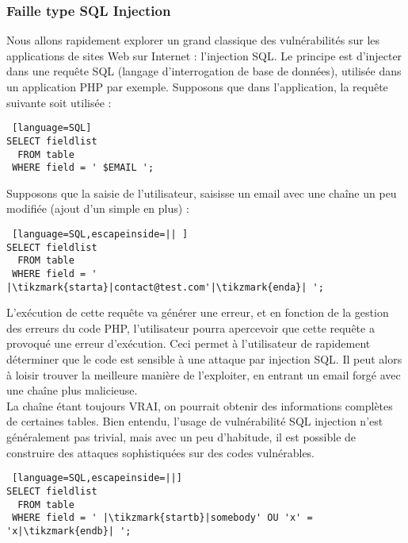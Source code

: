 \subsubsection{Faille type SQL Injection}

Nous allons rapidement explorer un grand classique des vulnérabilités sur les applications de sites Web sur Internet : l'injection SQL. Le principe est d'injecter dans une requête SQL (langage d'interrogation de base de données), utilisée dans un application PHP par exemple. Supposons que dans l'application, la requête suivante soit utilisée : \\
\begin{lstlisting} [language=SQL]
SELECT fieldlist
  FROM table 
 WHERE field = ' $EMAIL ';
\end{lstlisting}
Supposons que la saisie de l'utilisateur, saisisse un email avec une chaîne un peu modifiée (ajout d'un simple  en plus)  :
\\
\begin{lstlisting} [language=SQL,escapeinside=|| ]
SELECT fieldlist
  FROM table 
 WHERE field = '  |\tikzmark{starta}|contact@test.com'|\tikzmark{enda}| ';
\end{lstlisting}


L'exécution de cette requête va générer une erreur, et en fonction de la gestion des erreurs du code PHP, l'utilisateur pourra apercevoir que cette requête a provoqué une erreur d'exécution. Ceci permet à l'utilisateur de rapidement déterminer que le code est sensible à une attaque par injection SQL. Il peut alors à loisir trouver la meilleure manière de l'exploiter, en entrant un email forgé avec une chaîne plus malicieuse.\\

La chaîne   étant toujours VRAI, on pourrait obtenir des informations complètes de certaines tables.
Bien entendu, l'usage de vulnérabilité SQL injection n'est généralement pas trivial, mais avec un peu d'habitude, il est possible de construire des attaques sophistiquées sur des codes vulnérables.\\
\begin{lstlisting} [language=SQL,escapeinside=||]
SELECT fieldlist
  FROM table 
 WHERE field = ' |\tikzmark{startb}|somebody' OU 'x' = 'x|\tikzmark{endb}| ';
\end{lstlisting}


